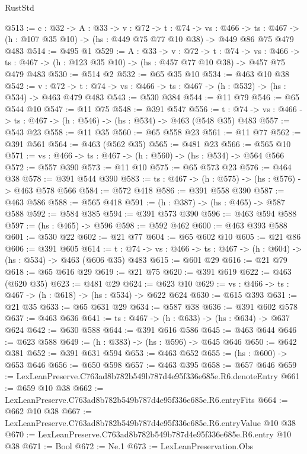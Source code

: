 \begin{lexlean}{RustStd}
\begin{coremodule}
@513 := {c : @32} ->
  {A : @33} ->
  {v : @72} ->
  {t : @74} ->
  {vs : @466} ->
  {ts : @467} -> (h : @107 @35 @10) -> (hs : @449 @75 @77 @10 @38) -> @449 @86 @75 @479 @483
@514 := @495 @1
@529 := {A : @33} ->
  {v : @72} ->
  {t : @74} ->
  {vs : @466} -> {ts : @467} -> (h : @123 @35 @10) -> (hs : @457 @77 @10 @38) -> @457 @75 @479 @483
@530 := @514 @2
@532 := @65 @35 @10
@534 := @463 @10 @38
@542 := {v : @72} ->
  {t : @74} -> {vs : @466} -> {ts : @467} -> (h : @532) -> (hs : @534) -> @463 @479 @483
@543 := @530 @384
@544 := @11 @79
@546 := @65 @544 @10
@547 := @11 @75
@548 := @391 @547
@556 := {t : @74} -> {vs : @466} -> {ts : @467} -> (h : @546) -> (hs : @534) -> @463 (@548 @35) @483
@557 := @543 @23
@558 := @11 @35
@560 := @65 @558 @23
@561 := @11 @77
@562 := @391 @561
@564 := @463 (@562 @35)
@565 := @481 @23
@566 := @565 @10
@571 := {vs : @466} -> {ts : @467} -> (h : @560) -> (hs : @534) -> @564 @566
@572 := @557 @390
@573 := @11 @10
@575 := @65 @573 @23
@576 := @464 @38
@578 := @391 @544 @390
@583 := {ts : @467} -> (h : @575) -> (hs : @576) -> @463 @578 @566
@584 := @572 @418
@586 := @391 @558 @390
@587 := @463 @586
@588 := @565 @418
@591 := (h : @387) -> (hs : @465) -> @587 @588
@592 := @584 @385
@594 := @391 @573 @390
@596 := @463 @594 @588
@597 := (hs : @465) -> @596
@598 := @592 @462
@600 := @463 @393 @588
@601 := @530 @22
@602 := @21 @77
@604 := @65 @602 @10
@605 := @21 @86
@606 := @391 @605
@614 := {t : @74} -> {vs : @466} -> {ts : @467} -> (h : @604) -> (hs : @534) -> @463 (@606 @35) @483
@615 := @601 @29
@616 := @21 @79
@618 := @65 @616 @29
@619 := @21 @75
@620 := @391 @619
@622 := @463 (@620 @35)
@623 := @481 @29
@624 := @623 @10
@629 := {vs : @466} -> {ts : @467} -> (h : @618) -> (hs : @534) -> @622 @624
@630 := @615 @393
@631 := @21 @35
@633 := @65 @631 @29
@634 := @587 @38
@636 := @391 @602 @578
@637 := @463 @636
@641 := {ts : @467} -> (h : @633) -> (hs : @634) -> @637 @624
@642 := @630 @588
@644 := @391 @616 @586
@645 := @463 @644
@646 := @623 @588
@649 := (h : @383) -> (hs : @596) -> @645 @646
@650 := @642 @381
@652 := @391 @631 @594
@653 := @463 @652
@655 := (hs : @600) -> @653 @646
@656 := @650 @598
@657 := @463 @395
@658 := @657 @646
@659 := LexLeanPreserve.C763ad8b782b549b787d4e95f336e685e.R6.denoteEntry
@661 := @659 @10 @38
@662 := LexLeanPreserve.C763ad8b782b549b787d4e95f336e685e.R6.entryFits
@664 := @662 @10 @38
@667 := LexLeanPreserve.C763ad8b782b549b787d4e95f336e685e.R6.entryValue @10 @38
@670 := LexLeanPreserve.C763ad8b782b549b787d4e95f336e685e.R6.entry @10 @38
@671 := Bool
@672 := Ne.{1}
@673 := LexLeanPreservation.Obs

\end{coremodule}
\end{lexlean}
